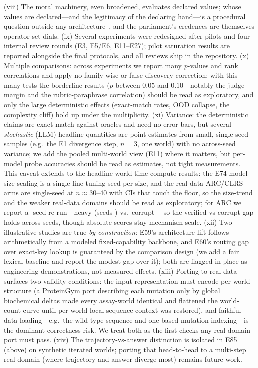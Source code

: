 \documentclass[11pt]{article}
\begin{document}
(viii) The moral machinery, even broadened, evaluates declared values; whose
values are declared---and the legitimacy of the declaring hand---is a
procedural question outside any architecture~\cite{scanlon1998}, and the
parliament's credences are themselves operator-set dials. (ix) Several
experiments were redesigned after pilots and four internal review rounds
(E3, E5/E6, E11--E27); pilot saturation results are reported alongside the
final protocols, and all reviews ship in the repository.
(x) Multiple comparisons: across \NumExperiments{} experiments we report many
$p$-values and rank correlations and apply no family-wise or
false-discovery correction; with this many tests the borderline results
($p$ between $0.05$ and $0.10$---notably the judge margin and the
rubric-paraphrase correlation) should be read as exploratory, and only the
large deterministic effects (exact-match rates, OOD collapse, the complexity
cliff) hold up under the multiplicity. (xi) Variance: the deterministic claims
are exact-match against oracles and need no error bars, but several
\emph{stochastic} (LLM) headline quantities are point estimates from small,
single-seed samples (e.g.\ the E1 divergence step, $n{=}3$, one world) with no
across-seed variance; we add the pooled multi-world view (E11) where it
matters, but per-model probe accuracies should be read as estimates, not tight
measurements. This caveat extends to the headline world-time-compute results: the
E74 model-size scaling is a single fine-tuning seed per size, and the real-data
ARC/CLRS arms are single-seed at $n{\approx}30$--$40$ with CIs that touch the floor,
so the size-trend and the weaker real-data domains should be read as exploratory;
for ARC we report a \ArcSeedsN-seed re-run---heavy \ArcHeavySeedMean{} (seeds
\ArcHeavySeedList) vs.\ corrupt \ArcCorruptSeedMean---so the verified-vs-corrupt gap holds across
seeds, though absolute scores stay mechanism-scale. (xii) Two illustrative studies are true \emph{by construction}:
E59's architecture lift follows arithmetically from a modeled fixed-capability
backbone, and E60's routing gap over exact-key lookup is guaranteed by the
comparison design (we add a fair lexical baseline and report the modest gap over
it); both are flagged in place as engineering demonstrations, not measured effects.
(xiii) Porting to real data surfaces two validity conditions: the input representation must
encode per-world structure (a ProteinGym port describing each mutation only by global
biochemical deltas made every assay-world identical and flattened the world-count curve until
per-world local-sequence context was restored), and faithful data loading---e.g.\ the wild-type
sequence and one-based mutation indexing---is the dominant correctness risk. We treat both as the
first checks any real-domain port must pass.
(xiv) The trajectory-vs-answer distinction is isolated in E85 (above) on synthetic iterated
worlds; porting that head-to-head to a multi-step real domain (where trajectory and answer
diverge most) remains future work.
\end{document}
